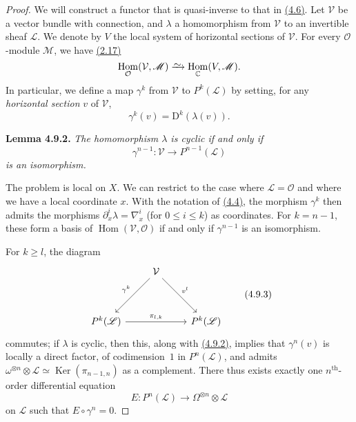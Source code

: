 \documentclass{report}
\newenvironment{itenv}[1]
  {\phantomsection\par\medskip\noindent\textbf{#1.}\itshape}
  {\medskip}
\newcommand{\scr}[1]{{\mathscr{#1}}}
\renewcommand{\cal}[1]{{\mathcal{#1}}}
\newcommand{\CC}{\mathbb{C}}
\newcommand{\DD}{\mathrm{D}}
\newcommand{\simto}{\xrightarrow{\raisebox{-0.7ex}[0ex][0ex]{$\sim$}}}
\renewcommand{\geq}{\geqslant}
\renewcommand{\leq}{\leqslant}
\DeclareMathOperator{\Ker}{Ker}
\DeclareMathOperator{\Hom}{Hom}
\newcommand{\oldpage}[1]{\marginpar{\footnotesize$\Big\vert$ \textit{p.~#1}}}
\begin{document}
\begin{proof}
  We will construct a functor that is quasi-inverse to that in \hyperref[I.4.6]{(4.6)}.
  Let $\cal{V}$ be a vector bundle with connection, and $\lambda$ a homomorphism from $\cal{V}$ to an invertible sheaf $\scr{L}$.
  We denote by $V$ the local system of horizontal sections of $\cal{V}$.
  For every $\cal{O}$-module $\scr{M}$, we have \hyperref[I.2.17]{(2.17)}
  \[
    \Hom_\cal{O}(\cal{V},\scr{M}) \simto \Hom_\CC(V,\scr{M}).
  \]
  In particular, we define a map $\gamma^k$ from $\cal{V}$ to $P^k(\scr{L})$ by setting, for any \emph{horizontal section} $v$ of $\cal{V}$,
  \[
  \label{I.4.9.1}
    \gamma^k(v) = \DD^k(\lambda(v)).
  \tag{4.9.1}
  \]

  \begin{itenv}{Lemma 4.9.2}
  \label{I.4.9.2}
    The homomorphism $\lambda$ is cyclic if and only if
    \[
      \gamma^{n-1}\colon \cal{V} \to P^{n-1}(\scr{L})
    \]
    is an isomorphism.
  \end{itenv}

  The problem is local on $X$.
  We can restrict to the case where $\scr{L}=\cal{O}$ and where we have a local coordinate $x$.
  With the notation of \hyperref[I.4.4]{(4.4)}, the morphism $\gamma^k$ then admits the morphisms $\partial_x^i\lambda = \nabla_x^i$ (for $0\leq i\leq k$) as coordinates.
  For $k=n-1$, these form a basis of $\Hom(\cal{V},\cal{O})$ if and only if $\gamma^{n-1}$ is an isomorphism.

  For $k\geq l$, the diagram
\oldpage{28}
  \[
  \label{I.4.9.3}
    \begin{tikzcd}[row sep=huge]
      & \cal{V} \dlar[swap,"\gamma^k"] \drar["v^l"] &
    \\P^k(\scr{L}) \ar[rr,"\pi_{l,k}"] && P^k(\scr{L})
    \end{tikzcd}
  \tag{4.9.3}
  \]
  commutes;
  if $\lambda$ is cyclic, then this, along with \hyperref[I.4.9.2]{(4.9.2)}, implies that $\gamma^n(v)$ is locally a direct factor, of codimension~$1$ in $P^n(\scr{L})$, and admits $\omega^{\otimes n}\otimes\scr{L} \simeq \Ker(\pi_{n-1,n})$ as a complement.
  There thus exists exactly one $n^\mathrm{th}$-order differential equation
  \[
    E\colon P^n(\scr{L}) \to \Omega^{\otimes n}\otimes\scr{L}
  \]
  on $\scr{L}$ such that $E\circ\gamma^n=0$.


\end{proof}
\end{document}
